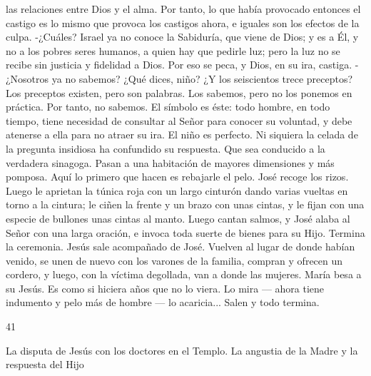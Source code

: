 \documentclass[12pt]{book} %
\begin{document}
las relaciones entre Dios y el alma. Por tanto, lo que había provocado entonces el castigo es lo mismo que provoca los castigos ahora, e iguales son los efectos de la culpa. 
-¿Cuáles? 
Israel ya no conoce la Sabiduría, que viene de Dios; y es a Él, y no a los pobres seres humanos, a quien hay que pedirle 
luz; pero la luz no se recibe sin justicia y fidelidad a Dios. Por eso se peca, y Dios, en su ira, castiga. 
-¿Nosotros ya no sabemos? ¿Qué dices, niño? ¿Y los seiscientos trece preceptos? 
Los preceptos existen, pero son palabras. Los sabemos, pero no los ponemos en práctica. Por tanto, no sabemos. El 
símbolo es éste: todo hombre, en todo tiempo, tiene necesidad de consultar al Señor para conocer su voluntad, y debe atenerse a ella para no atraer su ira. 
El niño es perfecto. Ni siquiera la celada de la pregunta insidiosa ha confundido su respuesta. Que sea conducido a la 
verdadera sinagoga. 
Pasan a una habitación de mayores dimensiones y más pomposa. Aquí lo primero que hacen es rebajarle el pelo. José 
recoge los rizos. Luego le aprietan la túnica roja con un largo cinturón dando varias vueltas en torno a la cintura; le ciñen la frente y un brazo con unas cintas, y le fijan con una especie de bullones unas cintas al manto. Luego cantan salmos, y José alaba al Señor con una larga oración, e invoca toda suerte de bienes para su Hijo. 
Termina la ceremonia. Jesús sale acompañado de José. Vuelven al lugar de donde habían venido, se unen de nuevo con 
los varones de la familia, compran y ofrecen un cordero, y luego, con la víctima degollada, van a donde las mujeres. 
María besa a su Jesús. Es como si hiciera años que no lo viera. Lo mira — ahora tiene indumento y pelo más de hombre — lo acaricia... 
Salen y todo termina. 
 
41 
 
La disputa de Jesús con los doctores en el Templo. La angustia de la Madre y la respuesta del Hijo 
 
\end{document}
